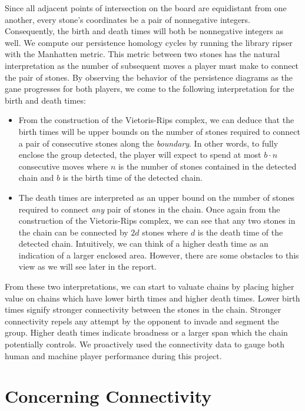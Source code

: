 \documentclass[12pt]{article}
\begin{document}
Since all adjacent points of intersection on the board are equidistant from one another, every stone's coordinates be a pair of nonnegative integers. Consequently, the birth and death times will both be nonnegative integers as well. We compute our persistence homology cycles by running the library ripser with the Manhatten metric. This metric between two stones has the natural interpretation as the number of subsequent moves a player must make to connect the pair of stones. By observing the behavior of the persistence diagrams as the gane progresses for both players, we come to the following interpretation for the birth and death times:
\begin{itemize}
  \item From the construction of the Vietoris-Rips complex, we can deduce that the birth times will be upper bounds on the number of stones required to connect a pair of consecutive stones along the \textit{boundary}. In other words, to fully enclose the group detected, the player will expect to spend at most $b\cdot n$ consecutive moves where $n$ is the number of stones contained in the detected chain and $b$ is the birth time of the detected chain.
  \item The death times are interpreted as an upper bound on the number of stones required to connect \textit{any} pair of stones in the chain. Once again from the construction of the Vietoris-Rips complex, we can see that any two stones in the chain can be connected by $2d$ stones where $d$ is the death time of the detected chain. Intuitively, we can think of a higher death time as an indication of a larger enclosed area. However, there are some obstacles to this view as we will see later in the report.
\end{itemize}

From these two interpretations, we can start to valuate chains by placing higher value on chains which have lower birth times and higher death times. Lower birth times signify stronger connectivity between the stones in the chain. Stronger connectivity repels any attempt by the opponent to invade and segment the group. Higher death times indicate broadness or a larger span which the chain potentially controls. We proactively used the connectivity data to gauge both human and machine player performance during this project.

\section{Concerning Connectivity}
\end{document}
